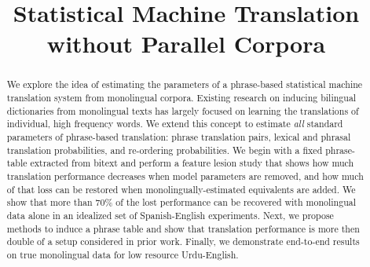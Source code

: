 \documentclass[11pt]{article}
\title{Statistical Machine Translation without Parallel Corpora}
\author{}
\date{}
\begin{document}
\maketitle
\begin{abstract}
We explore the idea of estimating the parameters of a phrase-based statistical machine translation system from monolingual corpora.  Existing research on inducing bilingual dictionaries from monolingual texts has largely focused on learning the translations of individual, high frequency words.   We extend this concept to estimate {\em all} standard parameters of phrase-based translation: phrase translation pairs, lexical and phrasal translation probabilities, and re-ordering probabilities.  We begin with a fixed phrase-table extracted from bitext and perform a feature lesion study that shows how much translation performance decreases when model parameters are removed, and how much of that loss can be restored when monolingually-estimated equivalents are added.  We show that more than 70\% of the lost performance can be recovered with monolingual data alone in an idealized set of Spanish-English experiments.  Next, we propose methods to induce a phrase table and show that translation performance is more then double of a setup considered in prior work.  Finally, we demonstrate end-to-end results on true monolingual data for low resource Urdu-English.




\end{abstract}
\end{document}
